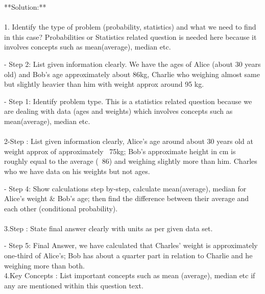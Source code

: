 \begin{enumerate}
   \end{enumerate}\newline\begin {center}   
      **Solution:**\\ \\
      1. Identify the type of problem (probability, statistics) and what we need to find in this case? Probabilities or Statistics related question is needed here because it involves concepts such as mean(average), median etc.\\  \newline\begin {enumerate}  
    - Step 2: List given information clearly. We have the ages of Alice (about 30 years old) and Bob's age approximately about 86kg, Charlie who weighing almost same but slightly heavier than him with weight approx around 95 kg.\\ \newline\begin {enumerate}
    - Step 1: Identify problem type. This is a statistics related question because we are dealing with data (ages and weights) which involves concepts such as mean(average), median etc.\\\ \\  
    2-Step : List given information clearly, Alice's age around about 30 years old at weight approx of approximately ~75kg; Bob’s approximate height in cm is roughly equal to the average (~86) and weighing slightly more than him. Charles who we have data on his weights but not ages.\\ \newline\begin {enumerate}
    - Step 4: Show calculations step by-step, calculate mean(average), median for Alice's weight & Bob’s age; then find the difference between their average and each other (conditional probability).\\ \\  3.Step : State final answer clearly with units as per given data set.\\ \newline\begin {enumerate}
    - Step 5: Final Answer, we have calculated that Charles' weight is approximately one-third of Alice’s; Bob has about a quarter part in relation to Charlie and he weighing more than both. \\  4.Key Concepts : List important concepts such as mean (average), median etc if any are mentioned within this question text.\\

\end{enumerate}
\end{enumerate}
\end{enumerate}
\end{enumerate}
\end{center}
